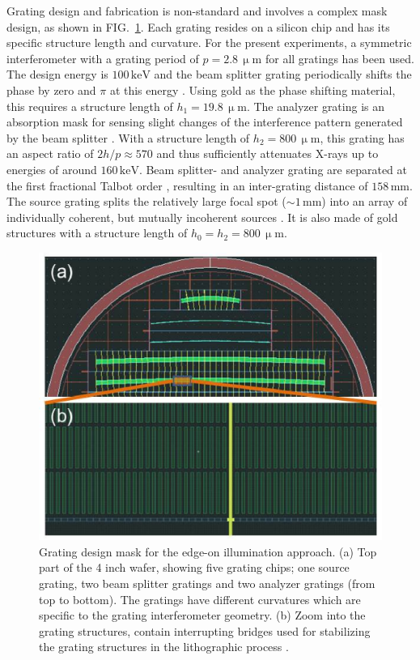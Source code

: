 \documentclass[aip,apl,amsmath,amssymb,floatfix,reprint,a4paper]{revtex4-1}
\newcommand{\unit}[1]{\ensuremath{\, \mathrm{#1}}}
\begin{document}
Grating design and fabrication is non-standard and involves a complex mask design, as shown in FIG.~\ref{Fig:grating_mask}. Each grating resides on a silicon chip and has its specific structure length and curvature. For the present experiments, a symmetric interferometer with a grating period of $p = 2.8 \unit{\upmu m}$ for all gratings has been used. The design energy is $100 \unit{keV}$ and the beam splitter grating periodically shifts the phase by zero and $\pi$ at this energy \cite{David2002}. Using gold as the phase shifting material, this requires a structure length of $h_1 = 19.8 \unit{\upmu m}$. The analyzer grating is an absorption mask for sensing slight changes of the interference pattern generated by the beam splitter \cite{Momose2003a}. With a structure length of $h_2 = 800 \unit{\upmu m}$, this grating has an aspect ratio of $2h/p \approx 570$ and thus sufficiently attenuates X-rays up to energies of around $160 \unit{keV}$. Beam splitter- and analyzer grating are separated at the first fractional Talbot order \cite{Weitkamp2005}, resulting in an inter-grating distance of $158 \unit{mm}$. The source grating splits the relatively large focal spot ($\sim 1 \unit{mm}$) into an array of individually coherent, but mutually incoherent sources \cite{Pfeiffer2006}. It is also made of gold structures with a structure length of $h_0 = h_2 = 800 \unit{\upmu m}$.
\begin{figure} [ht]
  \includegraphics[width = \linewidth]{figures/grating_mask.eps}
  \caption{Grating design mask for the edge-on illumination approach. (a) Top part of the 4 inch wafer, showing five grating chips; one source grating, two beam splitter gratings and two analyzer gratings (from top to bottom). The gratings have different curvatures which are specific to the grating interferometer geometry. (b) Zoom into the grating structures, contain interrupting bridges used for stabilizing the grating structures in the lithographic process \cite{Kenntner2010}.}
  \label{Fig:grating_mask}
\end{figure}
\end{document}
